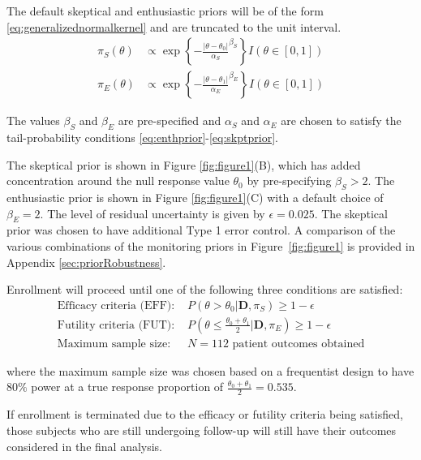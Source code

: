 \documentclass[12pt]{article}
\begin{document}
The default skeptical and enthusiastic priors will be of the form \eqref{eq:generalizednormalkernel} and are truncated to the unit interval. 
\begin{align}
\pi_S(\theta)&\propto \exp\left\{-\frac{|\theta-\theta_0|}{\alpha_S}^{\beta_S}\right\} I(\theta\in[0,1]) \label{eq:ex1skptprior}\\
\pi_E(\theta)&\propto \exp\left\{-\frac{|\theta-\theta_1|}{\alpha_E}^{\beta_E}\right\} I(\theta\in[0,1])\label{eq:ex1enthprior}
\end{align}

The values $\beta_S$ and $\beta_E$ are pre-specified and $\alpha_S$ and $\alpha_E$ are chosen to satisfy the tail-probability conditions 
\eqref{eq:enthprior}-\eqref{eq:skptprior}.

The skeptical prior is shown in Figure \ref{fig:figure1}(B), which has added concentration around the null response value $\theta_0$ by pre-specifying $\beta_S>2$. The enthusiastic prior is shown in Figure \ref{fig:figure1}(C) with a default choice of $\beta_E=2$. The level of residual uncertainty is given by $\epsilon=0.025$. The skeptical prior was chosen to have additional Type 1 error control. A comparison of the various combinations of the monitoring priors in Figure~\ref{fig:figure1} is provided in Appendix \ref{sec:priorRobustness}.

Enrollment will proceed until one of the following three conditions are satisfied:
\begin{align}
\text{Efficacy criteria (EFF): }&P(\theta>\theta_0|\mathbf{D},\pi_S)\geq 1-\epsilon \label{eq:ex1efficacy}\\
\text{Futility criteria (FUT): }&P\left(\theta\leq\frac{\theta_0+\theta_1}{2} \Big|\mathbf{D},\pi_E\right)\geq 1-\epsilon \label{eq:ex1futility}\\
\text{Maximum sample size: }&N=112 \text{ patient outcomes obtained}\label{eq:ex1maxss}
\end{align}

where the maximum sample size was chosen based on a frequentist design to have $80\%$ power at a true response proportion of $\frac{\theta_0+\theta_1}{2}=0.535$.

If enrollment is terminated due to the efficacy or futility criteria being satisfied, those subjects who are still undergoing follow-up will still have their outcomes considered in the final analysis.
\end{document}
